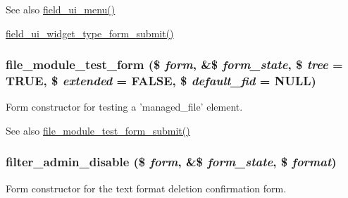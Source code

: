 \begin{DoxySeeAlso}{See also}
\hyperlink{field__ui_8module_a84565b21a33e9348e00755696dd26655}{field\_\-ui\_\-menu()} 

\hyperlink{field__ui_8admin_8inc_a0e5ede7769ff7c3d89a90096f0390c35}{field\_\-ui\_\-widget\_\-type\_\-form\_\-submit()} 
\end{DoxySeeAlso}
\hypertarget{group__forms_ga213f4f5000c3130fa6cd33969c25034e}{
\subsubsection[{file\_\-module\_\-test\_\-form}]{\setlength{\rightskip}{0pt plus 5cm}file\_\-module\_\-test\_\-form (\$ {\em form}, \/  \&\$ {\em form\_\-state}, \/  \$ {\em tree} = {\ttfamily TRUE}, \/  \$ {\em extended} = {\ttfamily FALSE}, \/  \$ {\em default\_\-fid} = {\ttfamily NULL})}}
\label{group__forms_ga213f4f5000c3130fa6cd33969c25034e}
Form constructor for testing a 'managed\_\-file' element.

\begin{DoxySeeAlso}{See also}
\hyperlink{file__module__test_8module_a95c4893bdf56f3e4446ed12bcbee36cd}{file\_\-module\_\-test\_\-form\_\-submit()} 
\end{DoxySeeAlso}
\hypertarget{group__forms_ga425ee204872a718d5b49c40acce75b69}{
\subsubsection[{filter\_\-admin\_\-disable}]{\setlength{\rightskip}{0pt plus 5cm}filter\_\-admin\_\-disable (\$ {\em form}, \/  \&\$ {\em form\_\-state}, \/  \$ {\em format})}}
\label{group__forms_ga425ee204872a718d5b49c40acce75b69}
Form constructor for the text format deletion confirmation form.


